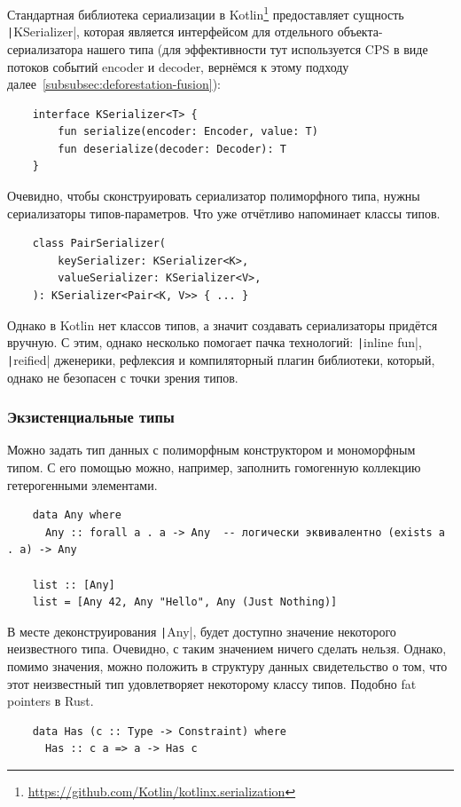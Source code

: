 Стандартная библиотека сериализации в Kotlin\footnote{\url{https://github.com/Kotlin/kotlinx.serialization}} предоставляет сущность \texttt|KSerializer|, которая является интерфейсом для отдельного объекта-сериализатора нашего типа (для эффективности тут используется CPS в виде потоков событий encoder и decoder, вернёмся к этому подходу далее\ \ref{subsubsec:deforestation-fusion}):
\begin{verbatim}
    interface KSerializer<T> {
        fun serialize(encoder: Encoder, value: T)
        fun deserialize(decoder: Decoder): T
    }
\end{verbatim}

Очевидно, чтобы сконструировать сериализатор полиморфного типа, нужны сериализаторы типов-параметров.
Что уже отчётливо напоминает классы типов.
\begin{verbatim}
    class PairSerializer(
        keySerializer: KSerializer<K>,
        valueSerializer: KSerializer<V>,
    ): KSerializer<Pair<K, V>> { ... }
\end{verbatim}

Однако в Kotlin нет классов типов, а значит создавать сериализаторы придётся вручную.
С этим, однако несколько помогает пачка технологий: \texttt|inline fun|, \texttt|reified| дженерики, рефлексия и компиляторный плагин библиотеки, который, однако не безопасен с точки зрения типов.

\subsubsection{Экзистенциальные типы} \label{subsubsec:existentials}

Можно задать тип данных с полиморфным конструктором и мономорфным типом.
С его помощью можно, например, заполнить гомогенную коллекцию гетерогенными элементами.
\begin{verbatim}
    data Any where
      Any :: forall a . a -> Any  -- логически эквивалентно (exists a . a) -> Any

    list :: [Any]
    list = [Any 42, Any "Hello", Any (Just Nothing)]
\end{verbatim}

В месте деконструирования \texttt|Any|, будет доступно значение некоторого неизвестного типа.
Очевидно, с таким значением ничего сделать нельзя.
Однако, помимо значения, можно положить в структуру данных свидетельство о том, что этот неизвестный тип удовлетворяет некоторому классу типов.
Подобно fat pointers в Rust.
\begin{verbatim}
    data Has (c :: Type -> Constraint) where
      Has :: c a => a -> Has c
\end{verbatim}


